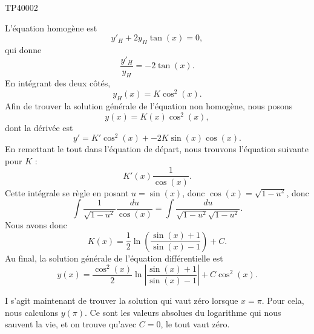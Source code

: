 \begin{corrige}{TP40002}

	L'équation homogène est
	\begin{equation}
		y'_H+2y_H\tan(x)=0,
	\end{equation}
	qui donne 
	\begin{equation}
		\frac{ y'_H }{ y_H }=-2\tan(x).
	\end{equation}
	En intégrant des deux côtés,
	\begin{equation}
		y_H(x)=K\cos^2(x).
	\end{equation}
	Afin de trouver la solution générale de l'équation non homogène, nous posons
	\begin{equation}
		y(x)=K(x)\cos^2(x),
	\end{equation}
	dont la dérivée est
	\begin{equation}
		y'=K'\cos^2(x)+-2K\sin(x)\cos(x).
	\end{equation}
	En remettant le tout dans l'équation de départ, nous trouvons l'équation suivante pour $K$ :
	\begin{equation}
		K'(x)\frac{1}{ \cos(x) }.
	\end{equation}
	Cette intégrale se règle en posant $u=\sin(x)$, donc $\cos(x)=\sqrt{1-u^2}$, donc
	\begin{equation}
		\int\frac{1}{ \sqrt{1-u^2} }\frac{ du }{ \cos(x) }=\int\frac{ du }{ \sqrt{1-u^2}\sqrt{1-u^2} }.
	\end{equation}
	Nous avons donc
	\begin{equation}
		K(x)=\frac{1}{ 2 }\ln\left( \frac{ \sin(x)+1 }{ \sin(x)-1 } \right)+C.
	\end{equation}
	Au final, la solution générale de l'équation différentielle est
	\begin{equation}
		y(x)=\frac{\cos^2(x)}{ 2 }\ln\left|  \frac{ \sin(x)+1 }{ \sin(x)-1 } \right|+C\cos^2(x).
	\end{equation}

	I s'agit maintenant de trouver la solution qui vaut zéro lorsque $x=\pi$. Pour cela, nous calculons $y(\pi)$. Ce sont les valeurs absolues du logarithme qui nous sauvent la vie, et on trouve qu'avec $C=0$, le tout vaut zéro.

\end{corrige}
